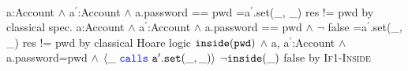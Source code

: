 \\{
	\begin{proofexample}
			{\proofstepwithrule
				{\hoareEx
						{a:Account $\wedge$ a$^\prime$:Account $\wedge$ a.password == pwd}
						{=a$^\prime$.set(\_, \_)}
						{res != pwd}
						}
					{by classical spec.}
			}
			{\proofstepwithrule
				{\hoareEx
						{a:Account $\wedge$ a$^\prime$:Account $\wedge$ a.password == pwd $\wedge$ $\neg$ false}
						{=a$^\prime$.set(\_, \_)}
						{res != pwd}
						}
					{by classical Hoare logic}
			}
			{\proofstepwithrule
				{\onlyIfSingleExAlt
						{$\texttt{inside}( {\texttt{pwd}} )$ $\wedge$ a, a$^\prime$:Account $\wedge$ a.password=pwd $\wedge$ $\langle \_\ {\color{blue}\texttt{calls}}\ {\texttt{a}}^\prime.{\texttt{set}}(\_, \_) \rangle$}
						{$\neg \texttt{inside}( \_ )$}
						{false}
						}
					{by \textsc{If1-Inside}}
			}
		\endproofsteps
	\end{proofexample}
	}\\
	
